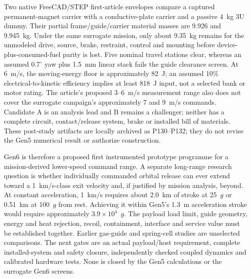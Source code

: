 \documentclass[conference]{IEEEtran}
\begin{document}
Two native FreeCAD/STEP first-article envelopes compare a captured permanent-magnet carrier with a conductive-plate carrier and a passive 4~kg 3U dummy. Their partial frame/guide/carrier material masses are 9.926 and 9.945~kg. Under the same surrogate mission, only about 9.35~kg remains for the unmodeled drive, source, brake, restraint, control and mounting before device-plus-consumed-fuel parity is lost. Five nominal travel stations clear, whereas an assumed 0.7$^{\circ}$ yaw plus 1.5~mm linear stack fails the guide clearance screen. At 6~m/s, the moving-energy floor is approximately 82~J; an assumed 10\% electrical-to-kinetic efficiency implies at least 818~J input, not a selected bank or motor rating. The article's proposed 3--6~m/s measurement range also does not cover the surrogate campaign's approximately 7 and 9~m/s commands. Candidate A is an analysis lead and B remains a challenger; neither has a complete circuit, contact/release system, brake or installed bill of materials. These post-study artifacts are locally archived as P130--P132; they do not revise the Gen5 numerical result or authorize construction.

Gen6 is therefore a proposed first instrumented prototype programme for a mission-derived lower-speed command range. A separate long-range research question is whether individually commanded orbital release can ever extend toward a 1~km/s-class exit velocity and, if justified by mission analysis, beyond. At constant acceleration, 1~km/s requires about 2.0~km of stroke at 25~$g$ or 0.51~km at 100~$g$ from rest. Achieving it within Gen5's 1.3~m acceleration stroke would require approximately $3.9\times10^4$~$g$. The payload load limit, guide geometry, energy and heat rejection, recoil, containment, interface and service value must be established together. Earlier gas-guide and spring-cell studies are unselected comparisons. The next gates are an actual payload/host requirement, complete installed-system and safety closure, independently checked coupled dynamics and calibrated hardware tests. None is closed by the Gen5 calculations or the surrogate Gen6 screens.
\end{document}
